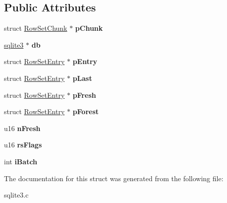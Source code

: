 \subsection*{Public Attributes}
\begin{DoxyCompactItemize}
\item 
struct \hyperlink{structRowSetChunk}{Row\+Set\+Chunk} $\ast$ {\bfseries p\+Chunk}\hypertarget{structRowSet_af064f9ec7b1ba820a3d53622bde9d42f}{}\label{structRowSet_af064f9ec7b1ba820a3d53622bde9d42f}

\item 
\hyperlink{structsqlite3}{sqlite3} $\ast$ {\bfseries db}\hypertarget{structRowSet_a7da847a06c2f90025fbd89c57516c6f6}{}\label{structRowSet_a7da847a06c2f90025fbd89c57516c6f6}

\item 
struct \hyperlink{structRowSetEntry}{Row\+Set\+Entry} $\ast$ {\bfseries p\+Entry}\hypertarget{structRowSet_a3eccaf69ad7863abae2541a7c0b94e1d}{}\label{structRowSet_a3eccaf69ad7863abae2541a7c0b94e1d}

\item 
struct \hyperlink{structRowSetEntry}{Row\+Set\+Entry} $\ast$ {\bfseries p\+Last}\hypertarget{structRowSet_a040c4b798e6f20d20aa99a45e93b2079}{}\label{structRowSet_a040c4b798e6f20d20aa99a45e93b2079}

\item 
struct \hyperlink{structRowSetEntry}{Row\+Set\+Entry} $\ast$ {\bfseries p\+Fresh}\hypertarget{structRowSet_a7c4e95bd08ff77135068bb3987be5ca1}{}\label{structRowSet_a7c4e95bd08ff77135068bb3987be5ca1}

\item 
struct \hyperlink{structRowSetEntry}{Row\+Set\+Entry} $\ast$ {\bfseries p\+Forest}\hypertarget{structRowSet_abe7ab16fffbe5992f637d6a17c6342ff}{}\label{structRowSet_abe7ab16fffbe5992f637d6a17c6342ff}

\item 
u16 {\bfseries n\+Fresh}\hypertarget{structRowSet_a0ed2a47d6789a70081f3454ef2604e7f}{}\label{structRowSet_a0ed2a47d6789a70081f3454ef2604e7f}

\item 
u16 {\bfseries rs\+Flags}\hypertarget{structRowSet_abfbd103e329e88d0a09ca5a7c9bbd225}{}\label{structRowSet_abfbd103e329e88d0a09ca5a7c9bbd225}

\item 
int {\bfseries i\+Batch}\hypertarget{structRowSet_a90ebc79619b880c1a38b96622ad0ffe0}{}\label{structRowSet_a90ebc79619b880c1a38b96622ad0ffe0}

\end{DoxyCompactItemize}


The documentation for this struct was generated from the following file\+:\begin{DoxyCompactItemize}
\item 
sqlite3.\+c\end{DoxyCompactItemize}
